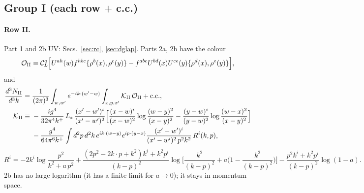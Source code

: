 \documentclass[10pt]{article}
\numberwithin{equation}{section}
\newcommand{\Ls}{L_{*}}
\newcommand{\CL}{\mathcal C_L}
\newcommand{\OO}{\mathcal O}
\newcommand{\KK}{\mathcal K}
\newcommand{\pre}{\frac{1}{(2\pi)^3}}
\newcommand{\phw}{e^{-ik\cdot(w'-w)}}
\begin{document}
\subsection{Group I (each row $+$ c.c.)}
\paragraph{Row II.} Part 1 and 2b UV: Secs.~\ref{sec:rc}, \ref{sec:dglap}. Parts 2a, 2b have the colour
\begin{equation*}
\OO_{\rm II}\equiv\CL^a\Big[U^{ah}(w)f^{hbc}\{\rho^b(x),\rho^c(y)\}-f^{abc}U^{bd}(x)U^{ce}(y)\{\rho^d(x),\rho^e(y)\}\Big],
\end{equation*}
and
\begin{align}
\frac{d^3N_{\rm II}}{d^3k}={}&\pre\int_{w,w'}\phw\int_{x,y,x'}\KK_{\rm II}\,\OO_{\rm II}+{\rm c.c.},\label{eq:II}\\
\KK_{\rm II}\equiv{}&-\frac{ig^4}{32\pi^4k^+}\,\Ls\,\frac{(x'-w')^i}{(x'-w')^2}\Big[\frac{(x-w)^i}{(x-w)^2}\log\frac{(w-y)^2}{(x-y)^2}-\frac{(y-w)^i}{(y-w)^2}\log\frac{(w-x)^2}{(x-y)^2}\Big]\notag\\
&-\frac{g^4}{64\pi^6k^+}\int d^2p\,d^2k\,e^{ik\cdot(w-y)}e^{ip\cdot(y-x)}\frac{(x'-w')^i}{(x'-w')^2\,p^2k^2}\,R^i(k,p),\notag
\end{align}
\begin{equation*}
R^i=-2k^i\log\frac{p^2}{k^2+a\,p^2}+\frac{(2p^2-2k\cdot p+k^2)k^i+k^2p^i}{(k-p)^2}\log\Big[\frac{k^2}{(k-p)^2}+a\Big(1-\frac{k^2}{(k-p)^2}\Big)\Big]-\frac{p^2k^i+k^2p^i}{(k-p)^2}\log(1-a).
\end{equation*}
2b has no large logarithm (it has a finite limit for $a\to0$); it stays in momentum space.
\end{document}
